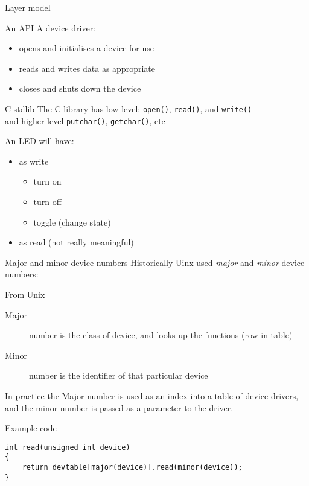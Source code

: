 \documentclass[xcolor=svgnames]{beamer}
\begin{document}
\begin{frame}{Layer model}

\end{frame}
\begin{frame}[fragile]{An API}
    A device driver:
    \begin{itemize}
        \item opens and initialises a device for use
        \item reads and writes data as appropriate
        \item closes and shuts down the device
    \end{itemize}
    \begin{block}{C stdlib}
        The C library has low level:
        \texttt{open()}, \texttt{read()}, and \texttt{write()}\\
        and higher level \texttt{putchar()}, \texttt{getchar()}, etc
    \end{block}
    An LED will have:
    \begin{itemize}
    \item as write
    \begin{itemize}
        \item turn on
        \item turn off
        \item toggle (change state)
    \end{itemize}
    \item as read (not really meaningful)
\end{itemize}
\end{frame}

\begin{frame}[fragile]{Major and minor device numbers}
    Historically Uinx used \emph{major} and \emph{minor} device numbers:
    \begin{block}{From Unix}
    \begin{description}
        \item[Major] number is the class of device, and looks up the functions (row in table)
        \item[Minor] number is the identifier of that particular device
    \end{description}
    \end{block}

    In practice the Major number is used as an index into a table of device drivers, and the minor number is passed as a parameter to the driver.

\begin{exampleblock}{Example code}
\begin{verbatim}
int read(unsigned int device)
{
    return devtable[major(device)].read(minor(device));
}
\end{verbatim}
\end{exampleblock}
\end{frame}
\end{document}
